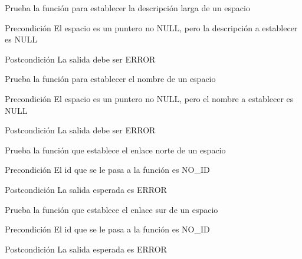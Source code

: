 \begin{DoxyRefList}
\item[\label{test__test000250}%
\hypertarget{test__test000250}{}%
Global \hyperlink{space__test_8c_a1273cecbf0126415fa33af5639ee3058}{test3\-\_\-space\-\_\-set\-\_\-long\-\_\-description} ()]Prueba la función para establecer la descripción larga de un espacio \begin{DoxyPrecond}{Precondición}
El espacio es un puntero no N\-U\-L\-L, pero la descripción a establecer es N\-U\-L\-L 
\end{DoxyPrecond}
\begin{DoxyPostcond}{Postcondición}
La salida debe ser E\-R\-R\-O\-R  
\end{DoxyPostcond}

\item[\label{test__test000244}%
\hypertarget{test__test000244}{}%
Global \hyperlink{space__test_8c_aa24a337830006e33706ab6ac1c416b47}{test3\-\_\-space\-\_\-set\-\_\-name} ()]Prueba la función para establecer el nombre de un espacio \begin{DoxyPrecond}{Precondición}
El espacio es un puntero no N\-U\-L\-L, pero el nombre a establecer es N\-U\-L\-L 
\end{DoxyPrecond}
\begin{DoxyPostcond}{Postcondición}
La salida debe ser E\-R\-R\-O\-R  
\end{DoxyPostcond}

\item[\label{test__test000255}%
\hypertarget{test__test000255}{}%
Global \hyperlink{space__test_8c_ac2961dcc4d7645660ca6953a70315b0a}{test3\-\_\-space\-\_\-set\-\_\-north} ()]Prueba la función que establece el enlace norte de un espacio \begin{DoxyPrecond}{Precondición}
El id que se le pasa a la función es N\-O\-\_\-\-I\-D 
\end{DoxyPrecond}
\begin{DoxyPostcond}{Postcondición}
La salida esperada es E\-R\-R\-O\-R  
\end{DoxyPostcond}

\item[\label{test__test000258}%
\hypertarget{test__test000258}{}%
Global \hyperlink{space__test_8c_ab2626f0045b225c79a8c5d56298e2065}{test3\-\_\-space\-\_\-set\-\_\-south} ()]Prueba la función que establece el enlace sur de un espacio \begin{DoxyPrecond}{Precondición}
El id que se le pasa a la función es N\-O\-\_\-\-I\-D 
\end{DoxyPrecond}
\begin{DoxyPostcond}{Postcondición}
La salida esperada es E\-R\-R\-O\-R  
\end{DoxyPostcond}


\end{DoxyRefList}
